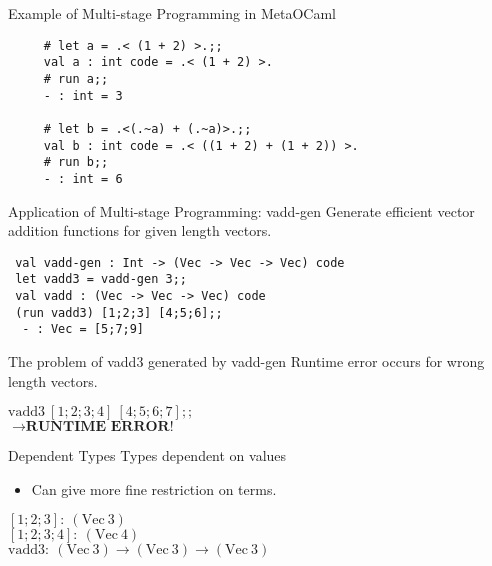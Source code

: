 \documentclass[dvipdfmx,aspectratio=169, 20pt]{beamer}
\begin{document}
\begin{frame}[fragile]{Example of Multi-stage Programming in MetaOCaml}
    \begin{center}
        \begin{verbatim}
     # let a = .< (1 + 2) >.;;
     val a : int code = .< (1 + 2) >.
     # run a;;
     - : int = 3

     # let b = .<(.~a) + (.~a)>.;;
     val b : int code = .< ((1 + 2) + (1 + 2)) >. 
     # run b;;
     - : int = 6
        \end{verbatim}
    \end{center}
    \note{
    }
\end{frame}

\begin{frame}[fragile]{Application of Multi-stage Programming: vadd-gen}
    Generate efficient vector addition functions for given length vectors.
    \begin{verbatim}
 val vadd-gen : Int -> (Vec -> Vec -> Vec) code
 let vadd3 = vadd-gen 3;;
 val vadd : (Vec -> Vec -> Vec) code
 (run vadd3) [1;2;3] [4;5;6];;
  - : Vec = [5;7;9]
    \end{verbatim}
    \note{
    }
\end{frame}

\begin{frame}[fragile]{The problem of vadd3 generated by vadd-gen}
    Runtime error occurs for wrong length vectors.
    \renewcommand{\V}{\text{Vec}}
    \begin{tabbing}
        \( \text{vadd3}\ [1;2;3;4]\ [4;5;6;7];; \) \\
        \( \longrightarrow \textbf{RUNTIME ERROR!} \)
    \end{tabbing}
    \note{
    }
\end{frame}

\begin{frame}[fragile]{Dependent Types}
    Types dependent on values
    \begin{itemize}
            \item Can give more fine restriction on terms.
    \end{itemize}
    \renewcommand{\V}{\text{Vec}\ }
    \begin{tabbing}
        \( [1;2;3]:\ (\V 3) \) \\
        \( [1;2;3;4]:\ (\V 4) \) \\
        \( \text{vadd3}:\ (\V 3) \to (\V 3) \to (\V 3) \)
    \end{tabbing}

\end{frame}
\end{document}

